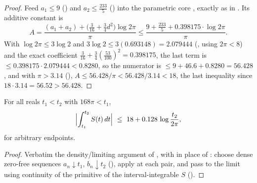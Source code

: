\begin{proof}
\leanok
Feed $a_1\le9$ () and $a_2\le\tfrac{233}5$
() into the parametric core
, exactly as in
. Its additive constant is
\[
  A=\frac{(a_1+a_2)+\bigl(\tfrac3{16}+\tfrac34 d^2\bigr)\log2\pi}{\pi}
   \le\frac{9+\tfrac{233}5+0.398175\cdot\log2\pi}{\pi} .
\]
With $\log2\pi\le3\log2$ and $3\log2\le3(0.693148)=2.079444$
(, using $2\pi<8$) and the exact coefficient
$\tfrac3{16}+\tfrac34(\tfrac{53}{100})^2=0.398175$, the last term is
$\le0.398175\cdot2.079444<0.8280$, so the numerator is
$\le9+46.6+0.8280=56.428$, and with $\pi>3.14$ (),
$A\le56.428/\pi<56.428/3.14<18$, the last inequality since $18\cdot3.14=56.52>56.428$.
\end{proof}

\begin{theorem}
\label{thm:le_sharp_unconditional}
\leanok
{}
For all reals $t_1<t_2$ with $168\pi<t_1$,
\[
  \Bigl|\int_{t_1}^{t_2}S(t)\,dt\Bigr|\ \le\ 18+0.128\,\log\frac{t_2}{2\pi},
\]
for arbitrary endpoints.
\end{theorem}

\begin{proof}
\leanok
Verbatim the density/limiting argument of , with
 in place of : choose dense zero-free sequences
$a_n\downarrow t_1$, $b_n\downarrow t_2$ (), apply
 at each pair, and pass to the limit using continuity of the primitive
of the interval-integrable $S$ ().
\end{proof}
